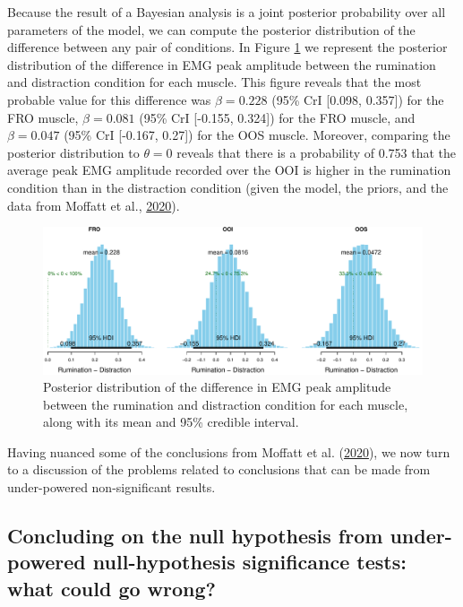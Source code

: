 \documentclass[
  english,
  man, donotrepeattitle,floatsintext]{apa6}
\begin{document}
Because the result of a Bayesian analysis is a joint posterior probability over all parameters of the model, we can compute the posterior distribution of the difference between any pair of conditions. In Figure \ref{fig:posterior} we represent the posterior distribution of the difference in EMG peak amplitude between the rumination and distraction condition for each muscle. This figure reveals that the most probable value for this difference was \(\beta = 0.228\) (95\% CrI {[}0.098, 0.357{]}) for the FRO muscle, \(\beta = 0.081\) (95\% CrI {[}-0.155, 0.324{]}) for the FRO muscle, and \(\beta = 0.047\) (95\% CrI {[}-0.167, 0.27{]}) for the OOS muscle. Moreover, comparing the posterior distribution to \(\theta = 0\) reveals that there is a probability of 0.753 that the average peak EMG amplitude recorded over the OOI is higher in the rumination condition than in the distraction condition (given the model, the priors, and the data from Moffatt et al., \protect\hyperlink{ref-moffatt_inner_2020}{2020}).

\begin{figure}[!htb]

{\centering \includegraphics[width=1\linewidth]{manuscript_files/figure-latex/posterior-1} 

}

\caption{Posterior distribution of the difference in EMG peak amplitude between the rumination and distraction condition for each muscle, along with its mean and 95\% credible interval.}\label{fig:posterior}
\end{figure}

Having nuanced some of the conclusions from Moffatt et al. (\protect\hyperlink{ref-moffatt_inner_2020}{2020}), we now turn to a discussion of the problems related to conclusions that can be made from under-powered non-significant results.

\hypertarget{concluding-on-the-null-hypothesis-from-under-powered-null-hypothesis-significance-tests-what-could-go-wrong}{%
\subsection{Concluding on the null hypothesis from under-powered null-hypothesis significance tests: what could go wrong?}\label{concluding-on-the-null-hypothesis-from-under-powered-null-hypothesis-significance-tests-what-could-go-wrong}}
\end{document}
